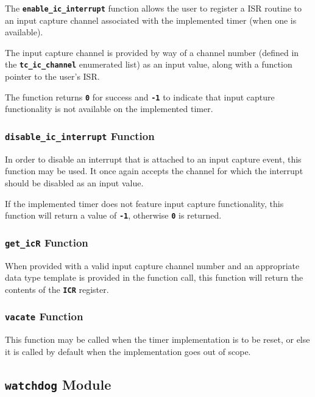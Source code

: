 \documentclass[a4paper, oneside, 11pt, titlepage, onecolumn, openright]{article}
\begin{document}
			The \textbf{\texttt{enable\_ic\_interrupt}} function allows the user to register a ISR routine to an input capture channel associated with the implemented timer (when one is available).
			
			The input capture channel is provided by way of a channel number (defined in the \textbf{\texttt{tc\_ic\_channel}} enumerated list) as an input value, along with a function pointer to the user's ISR.			
			
			The function returns \textbf{\texttt{0}} for success and \textbf{\texttt{-1}} to indicate that input capture functionality is not available on the implemented timer.	
			
\subsubsection{\textbf{\texttt{disable\_ic\_interrupt}} Function}
			\label{sss:HALtcdisable_ic_interruptFunction}
			
			In order to disable an interrupt that is attached to an input capture event, this function may be used. It once again accepts the channel for which the interrupt should be disabled as an input value.
 			
 			If the implemented timer does not feature input capture functionality, this function will return a value of \textbf{\texttt{-1}}, otherwise \textbf{\texttt{0}} is returned.
			
\subsubsection{\textbf{\texttt{get\_icR}} Function}
			\label{sss:HALtcget_icR_interruptFunction}
			
			When provided with a valid input capture channel number and an appropriate data type template is provided in the function call, this function will return the contents of the \textbf{\texttt{ICR}} register.	
			
\subsubsection{\textbf{\texttt{vacate}} Function}
			\label{sss:HALtcvacateFunction}
			
			This function may be called when the timer implementation is to be reset, or else it is called by default when the implementation goes out of scope.
			
\subsection{\textbf{\texttt{watchdog}} Module}
			\label{ss:HALwatchdogModule}
			
\end{document}
